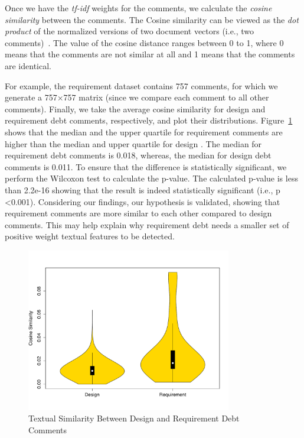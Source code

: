 Once we have the \textit{tf-idf} weights for the comments, we calculate the \textit{cosine similarity} between the comments. The Cosine similarity can be viewed as the \textit{dot product} of the normalized versions of two document vectors (i.e., two comments)~\cite{Manning2008book}. The value of the cosine distance ranges between 0 to 1, where 0 means that the comments are not similar at all and 1 means that the comments are identical.

For example, the requirement \SATD dataset contains 757 comments, for which we generate a 757$\times$757 matrix (since we compare each comment to all other comments).
Finally, we take the average cosine similarity for design and requirement debt comments, respectively, and plot their distributions.
Figure~\ref{fig:textual_similarity} shows that the median and the upper quartile for requirement \SATD comments are higher than the median and upper quartile for design \SATD.
The median for requirement debt comments is 0.018, whereas, the median for design debt comments is 0.011.
To ensure that the difference is statistically significant, we perform the Wilcoxon test to calculate the p-value. The calculated p-value is less than 2.2e-16 showing that the result is indeed statistically significant (i.e., p \textless 0.001). Considering our findings, our hypothesis is validated, showing that requirement \SATD comments are more similar to each other compared to design \SATD comments. This may help explain why requirement debt needs a smaller set of positive weight textual features to be detected.

\clearpage
\begin{figure}[!thb]
  \centering
  \includegraphics[width = 0.8\textwidth]{figures/chapter4/textual_similarity_removing_stop_words.pdf}
  \caption{Textual Similarity Between Design and Requirement Debt Comments}
  \label{fig:textual_similarity}
\end{figure}


